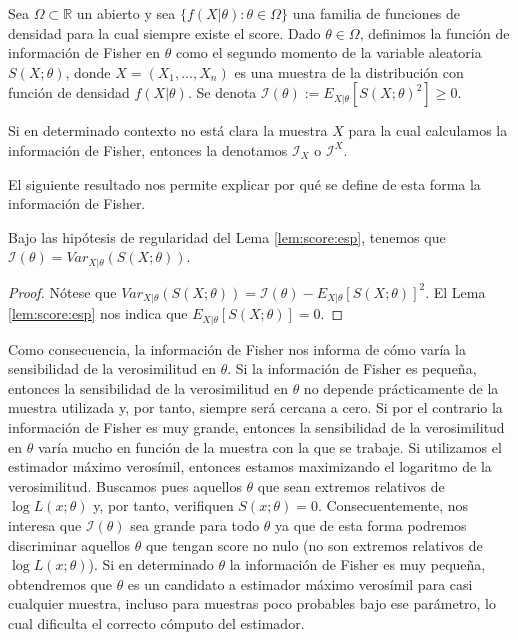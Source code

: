 \documentclass{article}
\begin{document}
    \begin{definition}
        Sea $\Omega \subset \mathbb{R}$ un abierto y sea $\{f(X|\theta): \theta \in \Omega\}$ una familia de funciones de densidad para la cual siempre existe el score. Dado $\theta \in \Omega$, definimos la función de información de Fisher en $\theta$ como el segundo momento de la variable aleatoria $S(X;\theta)$, donde $X = (X_1, \ldots, X_n)$ es una muestra de la distribución con función de densidad $f(X|\theta)$. Se denota $\mathcal{I}(\theta) := E_{X|\theta}[S(X;\theta)^2] \ge 0.$
    \end{definition}

    Si en determinado contexto no está clara la muestra $X$ para la cual calculamos la información de Fisher, entonces la denotamos $\mathcal{I}_X$ o $\mathcal{I}^X$.

    El siguiente resultado nos permite explicar por qué se define de esta forma la información de Fisher.

    \begin{cor}
        Bajo las hipótesis de regularidad del Lema \ref{lem:score:esp}, tenemos que  $\mathcal{I}(\theta) = Var_{X|\theta}(S(X;\theta))$.
    \end{cor}
    \begin{proof}
        Nótese que $Var_{X|\theta}(S(X;\theta)) = \mathcal{I}(\theta) - E_{X|\theta}[S(X; \theta)]^2$. El Lema \ref{lem:score:esp} nos indica que $E_{X|\theta}[S(X; \theta)] = 0$.
    \end{proof}

    Como consecuencia, la información de Fisher nos informa de cómo varía la sensibilidad de la verosimilitud en $\theta$. Si la información de Fisher es pequeña, entonces la sensibilidad de la verosimilitud en $\theta$ no depende prácticamente de la muestra utilizada y, por tanto, siempre será cercana a cero. Si por el contrario la información de Fisher es muy grande, entonces la sensibilidad de la verosimilitud en $\theta$ varía mucho en función de la muestra con la que se trabaje. Si utilizamos el estimador máximo verosímil, entonces estamos maximizando el logaritmo de la verosimilitud. Buscamos pues aquellos $\theta$ que sean extremos relativos de $\log L(x; \theta)$ y, por tanto, verifiquen $S(x; \theta) = 0$. Consecuentemente, nos interesa que $\mathcal{I}(\theta)$ sea grande para todo $\theta$ ya que de esta forma podremos discriminar aquellos $\theta$ que tengan score no nulo (no son extremos relativos de $\log L(x; \theta)$). Si en determinado $\theta$ la información de Fisher es muy pequeña, obtendremos que $\theta$ es un candidato a estimador máximo verosímil para casi cualquier muestra, incluso para muestras poco probables bajo ese parámetro, lo cual dificulta el correcto cómputo del estimador.
\end{document}
